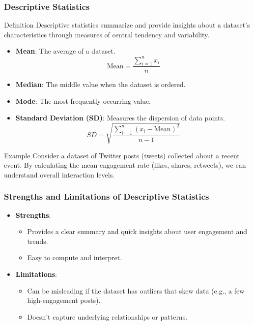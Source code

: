 \documentclass{beamer}
\begin{document}
\begin{frame}[fragile]
    \frametitle{Descriptive Statistics}
    \begin{block}{Definition}
        Descriptive statistics summarize and provide insights about a dataset's characteristics through measures of central tendency and variability.
    \end{block}
    
    \begin{itemize}
        \item \textbf{Mean}: The average of a dataset.  
        \[
        \text{Mean} = \frac{\sum_{i=1}^{n} x_i}{n}
        \]
        
        \item \textbf{Median}: The middle value when the dataset is ordered.
        
        \item \textbf{Mode}: The most frequently occurring value.
        
        \item \textbf{Standard Deviation (SD)}: Measures the dispersion of data points.  
        \[
        SD = \sqrt{\frac{\sum_{i=1}^n (x_i - \text{Mean})^2}{n-1}}
        \]
    \end{itemize}
    
    \begin{block}{Example}
        Consider a dataset of Twitter posts (tweets) collected about a recent event.
        By calculating the mean engagement rate (likes, shares, retweets), we can understand overall interaction levels. 
    \end{block}
\end{frame}

\begin{frame}[fragile]
    \frametitle{Strengths and Limitations of Descriptive Statistics}
    
    \begin{itemize}
        \item \textbf{Strengths}:
        \begin{itemize}
            \item Provides a clear summary and quick insights about user engagement and trends.
            \item Easy to compute and interpret.
        \end{itemize}
        
        \item \textbf{Limitations}:
        \begin{itemize}
            \item Can be misleading if the dataset has outliers that skew data (e.g., a few high-engagement posts).
            \item Doesn't capture underlying relationships or patterns.
        \end{itemize}
    \end{itemize}
\end{frame}
\end{document}
